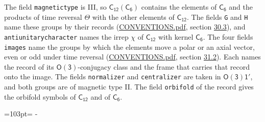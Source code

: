 \documentclass[10pt,a4paper]{article}
\newcommand{\needspace}[1]{\par\penalty-100\begingroup\dimen0=#1\relax\dimen2=\pagegoal
  \advance\dimen2-\pagetotal\ifdim\dimen0>\dimen2\relax\ifdim\dimen2>0pt\vfil\break\fi\fi
  \endgroup}
\numberwithin{equation}{section}
\newcommand{\grp}[1]{\mathsf{#1}}
\begin{document}
The field \texttt{magnetictype} is III, so $\grp{C_{12}}(\grp{C_{6}})$ contains the elements of $\grp{C_{6}}$ and the products of time reversal $\varTheta$ with the other elements of $\grp{C_{12}}$. The fields \texttt{G} and \texttt{H} name these groups by their records (\href{../../CONVENTIONS.pdf}{CONVENTIONS.pdf}, section \href{../../CONVENTIONS.pdf\#conv.30.3}{30.3}), and \texttt{antiunitarycharacter} names the irrep $\chi$ of $\grp{C_{12}}$ with kernel $\grp{C_{6}}$. The four fields \texttt{images} name the groups by which the elements move a polar or an axial vector, even or odd under time reversal (\href{../../CONVENTIONS.pdf}{CONVENTIONS.pdf}, section \href{../../CONVENTIONS.pdf\#conv.31.2}{31.2}). Each names the record of its $\grp{O(3)}$-conjugacy class and the frame that carries that record onto the image. The fields \texttt{normalizer} and \texttt{centralizer} are taken in $\grp{O(3)1'}$, and both groups are of magnetic type II. The field \texttt{orbifold} of the record gives the orbifold symbols of $\grp{C_{12}}$ and of $\grp{C_{6}}$.
\needspace{103pt}
\end{document}
